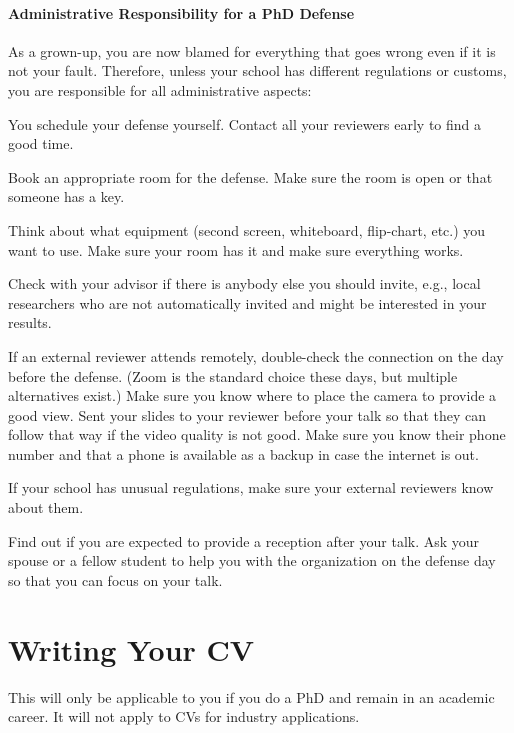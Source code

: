 \documentclass[12pt]{article}
\begin{document}
\paragraph{Administrative Responsibility for a PhD Defense}
As a grown-up, you are now blamed for everything that goes wrong even if it is not your fault.
Therefore, unless your school has different regulations or customs, you are responsible for all administrative aspects:
\begin{compactitem}
 \item You schedule your defense yourself. Contact all your reviewers early to find a good time.
 \item Book an appropriate room for the defense. Make sure the room is open or that someone has a key.
 \item Think about what equipment (second screen, whiteboard, flip-chart, etc.) you want to use.
   Make sure your room has it and make sure everything works.
 \item Check with your advisor if there is anybody else you should invite, e.g., local researchers who are not automatically invited and might be interested in your results.
 \item If an external reviewer attends remotely, double-check the connection on the day before the defense. (Zoom is the standard choice these days, but multiple alternatives exist.)
   Make sure you know where to place the camera to provide a good view.
   Sent your slides to your reviewer before your talk so that they can follow that way if the video quality is not good.
   Make sure you know their phone number and that a phone is available as a backup in case the internet is out.
 \item If your school has unusual regulations, make sure your external reviewers know about them.
 \item Find out if you are expected to provide a reception after your talk. Ask your spouse or a fellow student to help you with the organization on the defense day so that you can focus on your talk.
\end{compactitem}

\section{Writing Your CV}

This will only be applicable to you if you do a PhD and remain in an academic career.
It will not apply to CVs for industry applications.
\end{document}
